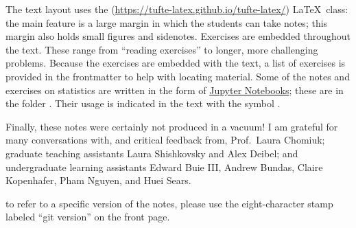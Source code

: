 The text layout uses the  (\url{https://tufte-latex.github.io/tufte-latex/}) \LaTeX\ class:  the main feature is a large margin in which the students can take notes; this margin also holds small figures and sidenotes. Exercises are embedded throughout the text.  These range from ``reading exercises'' to longer, more challenging problems.  Because the exercises are embedded with the text, a list of exercises is provided in the frontmatter to help with locating material. Some of the notes and exercises on statistics are written in the form of \href{http://jupyter.org}{Jupyter Notebooks}; these are in the folder . Their usage is indicated in the text with the symbol \notebook.

Finally, these notes were certainly not produced in a vacuum!
I am grateful for many conversations with, and critical feedback from, Prof.~Laura Chomiuk; graduate teaching assistants Laura Shishkovsky and Alex Deibel; and undergraduate learning assistants Edward Buie III, Andrew Bundas, Claire Kopenhafer, Pham Nguyen, and Huei Sears. 

 to refer to a specific version of the notes, please use the eight-character stamp labeled ``git version'' on the front page.
